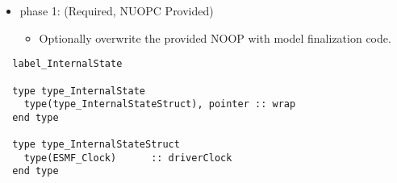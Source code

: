 \begin{itemize}
\item phase 1: ({\sc Required, NUOPC Provided})
  \begin{itemize}
  \item Optionally overwrite the provided NOOP with model finalization code.
  \end{itemize}      
\end{itemize}

\begin{verbatim}  label_InternalState

  type type_InternalState
    type(type_InternalStateStruct), pointer :: wrap
  end type

  type type_InternalStateStruct
    type(ESMF_Clock)      :: driverClock
  end type

\end{verbatim}

